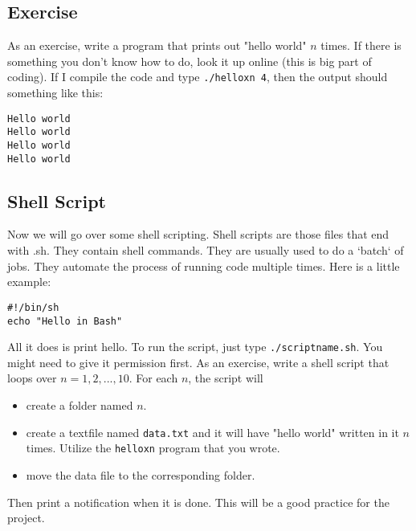 \documentclass{article}
\begin{document}
\subsection{Exercise}
As an exercise, write a program that prints out "hello world" $n$ times. If there is something you don't know how to do, look it up online (this is big part of coding). If I compile the code and type \texttt{./helloxn 4}, then the output should something like this:
\begin{verbatim}
Hello world
Hello world
Hello world
Hello world
\end{verbatim}

\subsection{Shell Script}
Now we will go over some shell scripting. Shell scripts are those files that end with .sh. They contain shell commands. They are usually used to do a `batch` of jobs. They automate the process of running code multiple times. Here is a little example:
\begin{verbatim}
#!/bin/sh
echo "Hello in Bash"
\end{verbatim}
All it does is print hello. To run the script, just type \texttt{./scriptname.sh}. You might need to give it permission first. As an exercise, write a shell script that loops over $n = 1,2,...,10$. For each $n$, the script will
\begin{itemize}
    \item create a folder named $n$.
    \item create a textfile named \texttt{data.txt} and it will have "hello world" written in it $n$ times. Utilize the \texttt{helloxn} program that you wrote.
    \item move the data file to the corresponding folder.
\end{itemize}
Then print a notification when it is done. This will be a good practice for the project.
\end{document}
